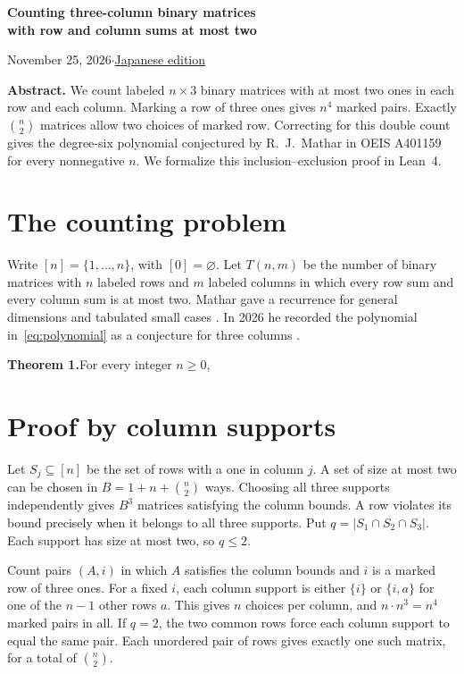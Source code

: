 \documentclass[a4paper,11pt]{article}
\begin{document}
\begin{center}
  {\Large\bfseries Counting three-column binary matrices\\[2pt]
    with row and column sums at most two\par}
  \vspace{4pt}
  {\small November 25, 2026\quad$\cdot$\quad\href{https://github.com/nktkt/math/blob/main/output/pdf/three-columns-ja.pdf}{Japanese edition}\par}
\end{center}
\smallskip

\noindent\textbf{Abstract.}\quad
We count labeled $n\times3$ binary matrices with at most two ones in each row and
each column. Marking a row of three ones gives $n^4$ marked pairs. Exactly
$\binom n2$ matrices allow two choices of marked row. Correcting for this double
count gives the degree-six
polynomial conjectured by R.~J.~Mathar in OEIS A401159 for
every nonnegative $n$. We formalize this inclusion--exclusion proof in Lean~4.

\section{The counting problem}
Write $[n]=\{1,\ldots,n\}$, with $[0]=\varnothing$. Let $T(n,m)$ be the number of
binary matrices with $n$ labeled rows and $m$ labeled columns in which every row
sum and every column sum is at most two. Mathar gave a recurrence for general
dimensions and tabulated small cases \cite[Section~2 and Table~2]{mathar2014}.
In 2026 he recorded the polynomial in~\eqref{eq:polynomial} as a conjecture for
three columns \cite{oeis}.

\smallskip
\noindent\textbf{Theorem 1.}\quad For every integer $n\geq 0$,
\threeColumnIdentities

\section{Proof by column supports}
Let $S_j\subseteq[n]$ be the set of rows with a one in column $j$. A set of size
at most two can be chosen in $B=1+n+\binom n2$ ways. Choosing all three supports
independently gives $B^3$ matrices satisfying the column bounds. A row violates
its bound precisely when it belongs to all three supports. Put
$q=|S_1\cap S_2\cap S_3|$. Each support has size at most two, so $q\leq 2$.

Count pairs $(A,i)$ in which $A$ satisfies the column bounds and $i$ is a marked
row of three ones. For a fixed $i$, each column support is either $\{i\}$ or
$\{i,a\}$ for one of the $n-1$ other rows $a$. This gives $n$ choices per column,
and $n\cdot n^3=n^4$ marked pairs in all. If $q=2$, the two common rows force
each column support to equal the same pair. Each unordered pair of rows gives
exactly one such matrix, for a total of $\binom n2$.
\end{document}
